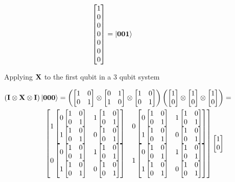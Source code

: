 \begin{figure}[H]
\begin{align*}
\begin{bmatrix}
            1\\
            0\\
            0\\
            0\\
            0\\
            0\\
            0
        \end{bmatrix}
        &=
        \ket{\qtz\qtz\qto}\\
    \end{align*}
    \caption{Applying $\qtx$ to the first qubit in a 3 qubit system}
    \label{fig:app_individual_application1}
\end{figure}


\begin{figure}[H]
    \centering
    \begin{align*}
        \left(\qti\otimes\qtx\otimes\qti\right)\ket{\qtz\qtz\qtz}=\left(\qi\otimes\qx\otimes\qi\right)\left(\qz\otimes\qz\otimes\qz\right)&= \\
        \begin{bmatrix}
            1
            \begin{bmatrix}
                0 \qi & 1 \qi\\
                1 \qi & 0 \qi\\
            \end{bmatrix}
            & 0
            \begin{bmatrix}
                0 \qi & 1 \qi\\
                1 \qi & 0 \qi\\
            \end{bmatrix}\\
            0 
            \begin{bmatrix}
                0 \qi & 1 \qi\\
                1 \qi & 0 \qi\\
            \end{bmatrix}
            & 1
            \begin{bmatrix}
                0 \qi & 1 \qi\\
                1 \qi & 0 \qi\\
            \end{bmatrix}\\ 
        \end{bmatrix}
        \begin{bmatrix}
            1\\
            0\\

\end{bmatrix}
\end{align*}
\end{figure}

